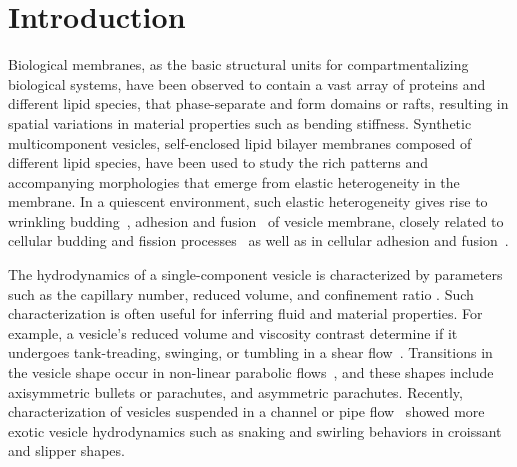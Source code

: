 \documentclass[twoside,twocolumn,9pt]{article}
\begin{document}

\section{\label{sec:Introduction}Introduction}
Biological membranes, as the basic structural units for
compartmentalizing biological systems, have been observed to contain a
vast array of proteins and different lipid species, that phase-separate
and form domains or rafts, resulting in spatial variations in material
properties such as bending stiffness. Synthetic multicomponent vesicles,
self-enclosed lipid bilayer membranes composed of different lipid
species, have been used to study the rich patterns and accompanying
morphologies that emerge from elastic heterogeneity in the membrane. In
a quiescent environment, such elastic heterogeneity gives rise to
wrinkling budding~\cite{Lowengrub2009_PRE, Li2012_CommMathSci}, adhesion
and fusion~\cite{Zhao2011_PRE} of vesicle membrane, closely related to
cellular budding and fission processes~\cite{Rauch2000_BiophysJ} as well
as in cellular adhesion and fusion~\cite{Takeda2003_PNAS}. 

The hydrodynamics of a single-component vesicle is characterized by
parameters such as the capillary number, reduced volume, and confinement
ratio \cite{Abreu2014_ACI}. Such characterization is often useful for
inferring fluid and material properties.
For example, a vesicle's reduced volume and viscosity contrast determine
if it undergoes tank-treading, swinging, or tumbling in a shear
flow~\cite{nog-gom2005}. Transitions in the vesicle shape occur in
non-linear parabolic flows~\cite{kao-bir-mis2009, dan-vla-mis2009}, and
these shapes include axisymmetric bullets or parachutes, and asymmetric
parachutes. Recently, characterization of vesicles suspended in a
channel or pipe flow~\cite{lyu-che-far-jae-mis-leo2023, aga-bir2020,
qua-gan-you2021, abb-far-nai-ezz-ben-mis2022,
wan-ii-sug-nod-jin-liu-che-gon2023} showed more exotic vesicle
hydrodynamics such as snaking and swirling behaviors in croissant and
slipper shapes.
\end{document}
